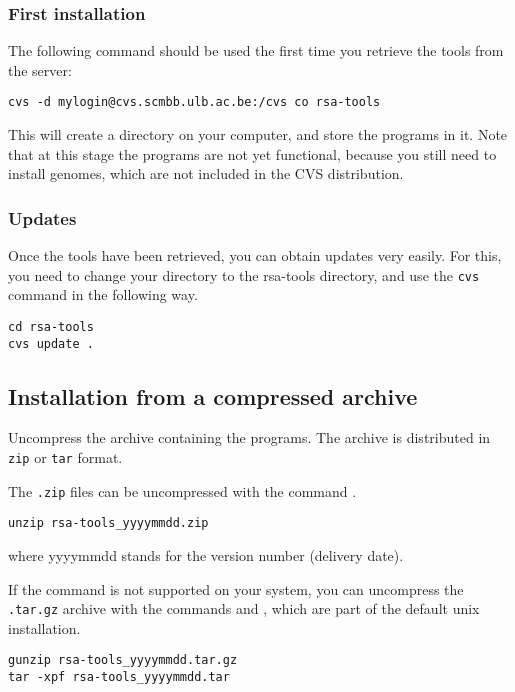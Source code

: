 \documentclass{article}
\begin{document}
\subsubsection{First installation}

The following command should be used the first time you retrieve the
tools from the server:
\begin{verbatim}
cvs -d mylogin@cvs.scmbb.ulb.ac.be:/cvs co rsa-tools
\end{verbatim}

This will create a directory  on your computer, and
store the programs in it. Note that at this stage the programs are not
yet functional, because you still need to install genomes, which are
not included in the CVS distribution.

\subsubsection{Updates}

Once the tools have been retrieved, you can obtain updates very
easily. For this, you need to change your directory to the rsa-tools
directory, and use the \texttt{cvs} command in the following way.

\begin{verbatim}
cd rsa-tools
cvs update .
\end{verbatim}


\subsection{Installation from a compressed archive}

Uncompress the archive containing the programs. The archive is
distributed in \texttt{zip} or \texttt{tar} format.

The \texttt{.zip} files can be uncompressed with the command
.

\begin{verbatim}
unzip rsa-tools_yyyymmdd.zip
\end{verbatim}
where yyyymmdd stands for the version number (delivery date).

If the  command is not supported on your system, you
can uncompress the \texttt{.tar.gz} archive with the commands
 and , which are part of the default unix
installation.

\begin{verbatim}
gunzip rsa-tools_yyyymmdd.tar.gz
tar -xpf rsa-tools_yyyymmdd.tar
\end{verbatim}
\end{document}
